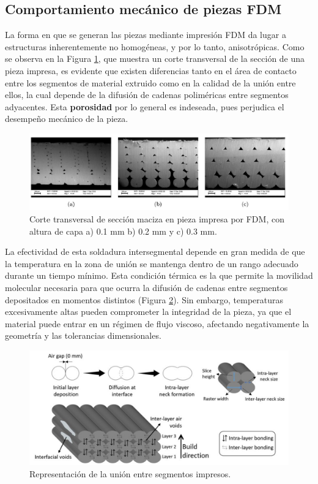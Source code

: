 \subsection{Comportamiento mecánico de piezas FDM}

La forma en que se generan las piezas mediante impresión FDM da lugar a estructuras inherentemente no homogéneas, y por lo tanto, anisotrópicas. Como se observa en la Figura \ref{porofig}, que muestra un corte transversal de la sección  de una pieza impresa, es evidente que existen diferencias tanto en el área de contacto entre los segmentos de material extruido como en la calidad de la unión entre ellos, la cual depende de la difusión de cadenas poliméricas entre segmentos adyacentes. Esta \textbf{porosidad} por lo general es indeseada, pues perjudica el desempeño mecánico de la pieza. 

\begin{figure}[h!]
	\centering
	\includegraphics[width=1.0\linewidth]{imgs/poro.png}
	\caption{Corte transversal de sección maciza en pieza impresa por FDM, con altura de capa a) 0.1 mm b) 0.2 mm y c) 0.3 mm. \cite{porob}}
	\label{porofig}
\end{figure} 

La efectividad de esta soldadura intersegmental depende en gran medida de que la temperatura en la zona de unión se mantenga dentro de un rango adecuado durante un tiempo mínimo. Esta condición térmica es la que permite la movilidad molecular necesaria para que ocurra la difusión de cadenas entre segmentos depositados en momentos distintos (Figura \ref{leyerfig}). Sin embargo, temperaturas excesivamente altas pueden comprometer la integridad de la pieza, ya que el material puede entrar en un régimen de flujo viscoso, afectando negativamente la geometría y las tolerancias dimensionales.

\begin{figure}[h!]
	\centering
	\includegraphics[width=0.9\linewidth]{imgs/leyer.png}
	\caption{Representación de la unión entre segmentos impresos. \cite{leyerb}}
	\label{leyerfig}
\end{figure} 

